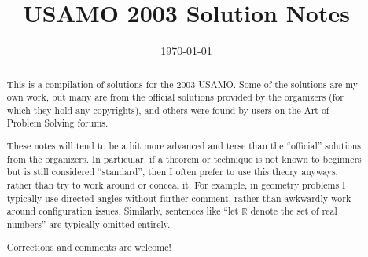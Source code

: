 \documentclass[11pt]{scrartcl}
\title{USAMO 2003 Solution Notes}
\date{\today}
\begin{document}
\maketitle

\begin{abstract}
This is a compilation of solutions
for the 2003 USAMO.
Some of the solutions are my own work,
but many are from the official solutions provided by the organizers
(for which they hold any copyrights),
and others were found by users on the Art of Problem Solving forums.

These notes will tend to be a bit more advanced and terse than the ``official''
solutions from the organizers.
In particular, if a theorem or technique is not known to beginners
but is still considered ``standard'', then I often prefer to
use this theory anyways, rather than try to work around or conceal it.
For example, in geometry problems I typically use directed angles
without further comment, rather than awkwardly work around configuration issues.
Similarly, sentences like ``let $\mathbb{R}$ denote the set of real numbers''
are typically omitted entirely.

Corrections and comments are welcome!
\end{abstract}

\tableofcontents
\newpage

\addtocounter{section}{-1}
\end{document}
